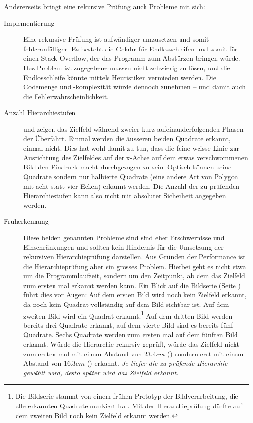 Andererseits bringt eine rekursive Prüfung auch Probleme mit sich:

\begin{description}
    \item[Implementierung] Eine rekursive Prüfung ist aufwändiger umzusetzen und somit fehleranfälliger. Es besteht die Gefahr für Endlosschleifen und somit für einen Stack Overflow, der das Programm zum Abstürzen bringen würde. Das Problem ist zugegebenermassen nicht schwierig zu lösen, und die Endlosschleife könnte mittels Heuristiken vermieden werden. Die Codemenge und -komplexität würde dennoch zunehmen -- und damit auch die Fehlerwahrscheinlichkeit.
    \item[Anzahl Hierarchiestufen]  und  zeigen das Zielfeld während zweier kurz aufeinanderfolgenden Phasen der Überfahrt. Einmal werden die äusseren beiden Quadrate erkannt, einmal nicht. Dies hat wohl damit zu tun, dass die feine weisse Linie zur Ausrichtung des Zielfeldes auf der x-Achse auf dem etwas verschwommenen Bild den Eindruck macht durchgezogen zu sein. Optisch können keine Quadrate sondern nur halbierte Quadrate (eine andere Art von Polygon mit acht statt vier Ecken) erkannt werden. Die Anzahl der zu prüfenden Hierarchiestufen kann also nicht mit absoluter Sicherheit angegeben werden.
    \item[Früherkennung] Diese beiden genannten Probleme sind sind eher Erschwernisse und Einschränkungen und sollten kein Hindernis für die Umsetzung der rekursiven Hierarchieprüfung darstellen. Aus Gründen der Performance ist die Hierarchieprüfung aber ein grosses Problem. Hierbei geht es nicht etwa um die Programmlaufzeit, sondern um den Zeitpunkt, ab dem das Zielfeld zum ersten mal erkannt werden kann. Ein Blick auf die Bildserie (Seite \pageref{fig:bildserie}) führt dies vor Augen: Auf dem ersten Bild wird noch kein Zielfeld erkannt, da noch kein Quadrat vollständig auf dem Bild sichtbar ist. Auf dem zweiten Bild wird ein Quadrat erkannt.\footnote{Die Bildserie stammt von einem frühen Prototyp der Bildverarbeitung, die alle erkannten Quadrate markiert hat. Mit der Hierarchieprüfung dürfte auf dem zweiten Bild noch kein Zielfeld erkannt werden.} Auf dem dritten Bild werden bereits drei Quadrate erkannt, auf dem vierte Bild sind es bereits fünf Quadrate. Sechs Quadrate werden zum ersten mal auf dem fünften Bild erkannt. Würde die Hierarchie rekursiv geprüft, würde das Zielfeld nicht zum ersten mal mit einem Abstand von $23.4cm$ () sondern erst mit einem Abstand von $16.3cm$ () erkannt. \textit{Je tiefer die zu prüfende Hierarchie gewählt wird, desto später wird das Zielfeld erkannt.}
\end{description}

